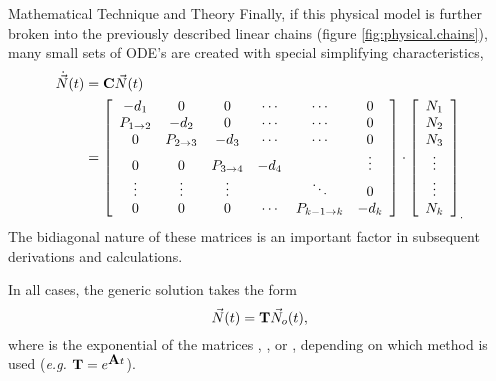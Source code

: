 \begin{chapter}{Mathematical Technique and Theory\label{chap:math}}
  Finally, if this physical model is further broken into the
  previously described linear chains (figure
  \ref{fig:physical.chains}), many small sets of ODE's are created
  with special simplifying characteristics,
  \begin{equation}
    \begin{split}
      \dot{\vec{N}}(t) &= \mbox{$\mathbf{C}$}\vec{N}(t)\\
        &= \left [
          \begin{array}{cccccc}
            -d_1 & 0 & 0 & \cdots & \cdots & 0 \\
            P_{1\rightarrow 2} & -d_2 & 0 & \cdots & \cdots & 0\\
            0 & P_{2\rightarrow 3} & -d_3 & \cdots & \cdots & 0 \\
            0 & 0 & P_{3\rightarrow 4} & -d_4 &  & \vdots\\
            \vdots & \vdots & \vdots & & \ddots & 0\\
            0 & 0 & 0 & \cdots & P_{k-1\rightarrow k} & -d_k
          \end{array} \right ] \cdot \left [
          \begin{array}{c}
            N_1 \\ N_2 \\ N_3 \\ \vdots \\ \vdots \\ N_k
          \end{array} \right ]_.\label{eq:math.intro.chains}
    \end{split}
  \end{equation}
  The bidiagonal nature of these matrices is an important factor in
  subsequent derivations and calculations.

  In all cases, the generic solution takes the form
  \begin{equation}
    \vec{N}(t) = \mbox{$\mathbf{T}$}\vec{N}_o(t),\label{eq:math.intro.main}
  \end{equation}
  where  is the exponential of the matrices , ,
  or , depending on which method is used (\textsl{e.g.}
  $\mbox{$\mathbf{T}$} = e^{\mbox{$\mathbf{A}$} t}$).
  

\end{chapter}
